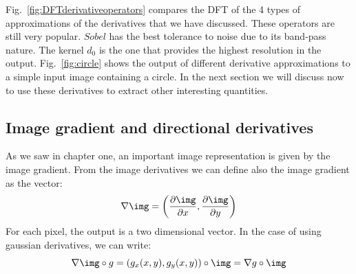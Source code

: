 Fig.~\ref{fig:DFTderivativeoperators} compares the DFT of the 4 types of approximations of the derivatives that we have discussed. These operators are still very popular. $Sobel$ has the best tolerance to noise due to its band-pass nature. The kernel $d_0$ is the one that provides the highest resolution in the output. Fig.~\ref{fig:circle} shows the output of different derivative approximations to a simple input image containing a circle. In the next section we will discuss now to use these derivatives to extract other interesting quantities.


\subsection{Image gradient and directional derivatives}

As we saw in chapter one, an important image representation is given by the image gradient. From the image derivatives we can define also the image gradient as the vector:
\begin{equation}
	\nabla \img = \left( \frac{\partial \img}{\partial x}, \frac{\partial \img}{\partial y} \right)
\end{equation}
For each pixel, the output is a two dimensional vector.  In the case of using gaussian derivatives, we can write:
\begin{equation}
	\nabla \img \circ g = \left( g_x(x,y), g_y(x,y) \right) \circ \img = \nabla g \circ \img
\end{equation}


